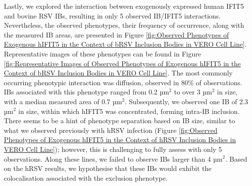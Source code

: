 Lastly, we explored the interaction between exogenously expressed human IFIT5 and bovine RSV IBs, resulting in only 5 observed IB/IFIT5 interactions. Nevertheless, the observed phenotypes, their frequency of occurrence, along with the measured IB areas, are presented in Figure \ref{fig:Observed Phenotypes of Exogenous hIFIT5 in the Context of bRSV Inclusion Bodies in VERO Cell Line}. Representative images of these phenotypes can be found in Figure \ref{fig:Representative Images of Observed Phenotypes of Exogenous hIFIT5 in the Context of bRSV Inclusion Bodies in VERO Cell Line}. The most commonly occurring phenotypic interaction was diffusion, observed in 80\% of observations. IBs associated with this phenotype ranged from 0.2 \(\mbox{µm}^2\) to over 3 \(\mbox{µm}^2\) in size, with a median measured area of 0.7 \(\mbox{µm}^2\). Subsequently, we observed one IB of 2.3 \(\mbox{µm}^2\) in size, within which hIFIT5 was concentrated, forming intra-IB inclusion. There seems to be a hint of phenotype separation based on IB size, similar to what we observed previously with hRSV infection (Figure \ref{fig:Observed Phenotypes of Exogenous hIFIT5 in the Context of hRSV Inclusion Bodies in VERO Cell Line}); however, this is challenging to fully assess with only 5 observations. Along these lines, we failed to observe IBs larger than 4 \(\mbox{µm}^2\). Based on the hRSV results, we hypothesise that these IBs would exhibit the colocalisation associated with the exclusion phenotype.

